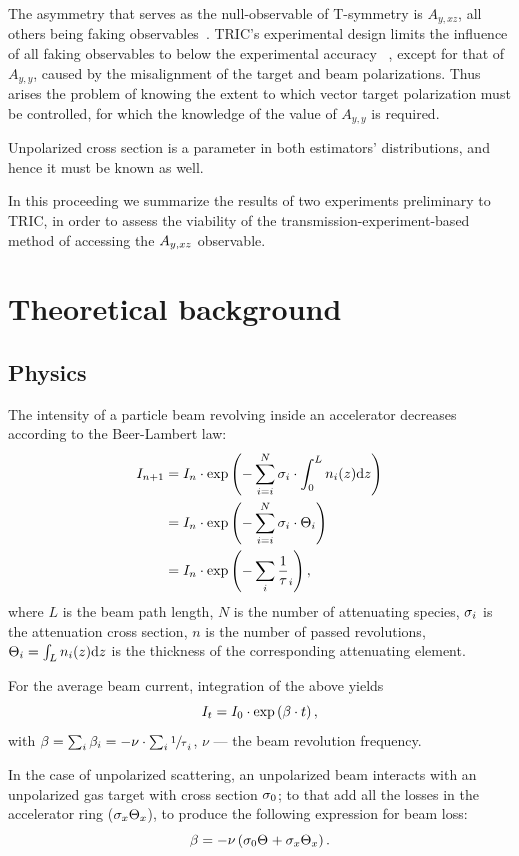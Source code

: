 \documentclass[reprint, superscriptaddress]{revtex4-1}
\newcommand{\td}{\mathrm{d}}
\begin{document}
The asymmetry that serves as the null-observable of T-symmetry is $A_{y,xz}$, all others being faking observables~\cite{Conzett}. TRIC's experimental design limits the influence of all faking observables to below the experimental accuracy ~\cite{Proposal}, except for that of $A_{y,y}$, caused by the misalignment of the target and beam polarizations. Thus arises the problem of knowing the extent to which vector target polarization must be controlled, for which the knowledge of the value of $A_{y,y}$ is required. 

Unpolarized cross section is a parameter in both estimators' distributions, and hence it must be known as well. 

In this proceeding we summarize the results of two experiments preliminary to TRIC, in order to assess the viability of the transmission-experiment-based method of accessing the $\Ayxz$ observable.

\section{Theoretical background}
\subsection{Physics}
The intensity of a particle beam revolving inside an accelerator decreases according to the Beer-Lambert law:
\begin{align*}
	I_{n+1} &= I_n \cdot \exp\bkt{-\sum_{i=i}^N \CS[i]\cdot\int_0^L n_i(z)\td z} \\
			&= I_n \cdot \exp\bkt{-\sum_{i=i}^N \CS[i]\cdot \Thick[i]} \\
			&= I_n \cdot \exp\bkt{-\sum_i\frac1\tau_i},
\end{align*}
where $L$ is the beam path length, $N$ is the number of attenuating species, $\CS[i]$ is the attenuation cross section, $n$ is the number of passed revolutions, $\Thick[i] = \int_L n_i(z)\td z$ is the thickness of the corresponding attenuating element.

For the average beam current, integration of the above yields
\begin{equation}\label{eq:CurrentDecay}
	I_t = I_0 \cdot \exp\bkt{\slp\cdot t},
\end{equation}
with $\slp = \sum_i \slp[i] = - \nu\cdot\sum_i \sfrac1\tau_i$, $\nu$ --- the beam revolution frequency. 

In the case of unpolarized scattering, an unpolarized beam interacts with an unpolarized gas target with cross section $\CS[0]$; to that add all the losses in the accelerator ring ($\CS[x]\Thick[x]$), to produce the following expression for beam loss:
\begin{equation}\label{eq:SlopeModel}
	\slp = -\nu\bkt{\CS[0]\Thick + \CS[x]\Thick[x]}.
\end{equation}
\end{document}
